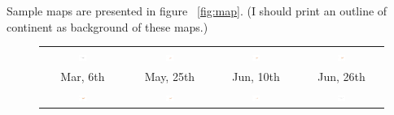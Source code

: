 
Sample maps are presented in figure ~\ref{fig:map}. (I should print an outline of continent as background of these maps.)

\begin{figure}
\begin{center}
\begin{tabular}{cccc}
\includegraphics[width=0.10\textwidth]{map/72.png} &
\includegraphics[width=0.10\textwidth]{map/77.png} &
\includegraphics[width=0.10\textwidth]{map/78.png} &
\includegraphics[width=0.10\textwidth]{map/79.png}  \\
Mar, 6th&May, 25th&Jun, 10th&Jun, 26th\\
\includegraphics[width=0.10\textwidth]{map/82.png} &
\includegraphics[width=0.10\textwidth]{map/83.png} &
\includegraphics[width=0.10\textwidth]{map/84.png} &
\includegraphics[width=0.10\textwidth]{map/91.png}  \\

\end{tabular}
\end{center}
\end{figure}
